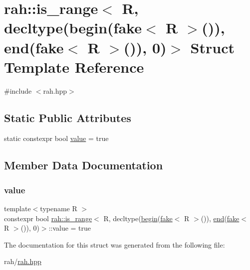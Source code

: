 \hypertarget{structrah_1_1is__range_3_01_r_00_01decltype_07begin_07fake_3_01_r_01_4_07_08_08_00_01end_07fake_cf1a9a1e2579209cb82001bc9eda23c1}{}\section{rah\+::is\+\_\+range$<$ R, decltype(begin(fake$<$ R $>$()), end(fake$<$ R $>$()), 0)$>$ Struct Template Reference}
\label{structrah_1_1is__range_3_01_r_00_01decltype_07begin_07fake_3_01_r_01_4_07_08_08_00_01end_07fake_cf1a9a1e2579209cb82001bc9eda23c1}


{\ttfamily \#include $<$rah.\+hpp$>$}

\subsection*{Static Public Attributes}
\begin{DoxyCompactItemize}
\item 
static constexpr bool \mbox{\hyperlink{structrah_1_1is__range_3_01_r_00_01decltype_07begin_07fake_3_01_r_01_4_07_08_08_00_01end_07fake_cf1a9a1e2579209cb82001bc9eda23c1_a2db25b392468218215a33d83c40913bf}{value}} = true
\end{DoxyCompactItemize}


\subsection{Member Data Documentation}
\mbox{\label{structrah_1_1is__range_3_01_r_00_01decltype_07begin_07fake_3_01_r_01_4_07_08_08_00_01end_07fake_cf1a9a1e2579209cb82001bc9eda23c1_a2db25b392468218215a33d83c40913bf}} 
\subsubsection{\texorpdfstring{value}{value}}
{\footnotesize\ttfamily template$<$typename R $>$ \\
constexpr bool \mbox{\hyperlink{structrah_1_1is__range}{rah\+::is\+\_\+range}}$<$ R, decltype(\mbox{\hyperlink{namespacerah_a2c4a19e57cc4e0753e93830f247def6d}{begin}}(\mbox{\hyperlink{namespacerah_a11785bbdf970efa1bc57fc14993b77bf}{fake}}$<$ R $>$()), \mbox{\hyperlink{namespacerah_aaddd1442cd76b96876e692cdefe7261d}{end}}(\mbox{\hyperlink{namespacerah_a11785bbdf970efa1bc57fc14993b77bf}{fake}}$<$ R $>$()), 0)$>$\+::value = true\hspace{0.3cm}{\ttfamily [static]}}



The documentation for this struct was generated from the following file\+:\begin{DoxyCompactItemize}
\item 
rah/\mbox{\hyperlink{rah_8hpp}{rah.\+hpp}}\end{DoxyCompactItemize}
